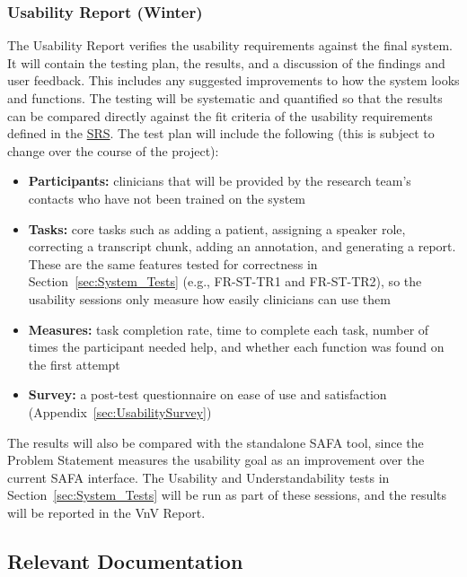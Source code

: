 \documentclass[12pt, titlepage]{article}
\newcommand{\SRSLink}{\href{https://github.com/Nour-Fawaz/MacaBoca/blob/main/pdfs/SRS/SRS.pdf}{SRS}}
\renewcommand{\_}{\oldunderscore\allowbreak}
\begin{document}
\subsubsection{Usability Report (Winter)}
The Usability Report verifies the usability requirements against the final system.
It will contain the testing plan, the results, and a discussion of the findings and user feedback. This includes any suggested improvements to how the system looks and functions.
The testing will be systematic and quantified so that the results can be compared directly against the fit criteria of the usability requirements defined in the \SRSLink{}.
The test plan will include the following (this is subject to change over the course of the project):
\begin{itemize}
  \item \textbf{Participants:} clinicians that will be provided by the research team's contacts who have not been trained on the system
  \item \textbf{Tasks:} core tasks such as adding a patient, assigning a speaker role, correcting a transcript chunk, adding an annotation, and generating a report. These are the same features tested for correctness in Section~\ref{sec:System_Tests} (e.g., FR-ST-TR1 and FR-ST-TR2), so the usability sessions only measure how easily clinicians can use them
  \item \textbf{Measures:} task completion rate, time to complete each task, number of times the participant needed help, and whether each function was found on the first attempt
  \item \textbf{Survey:} a post-test questionnaire on ease of use and satisfaction (Appendix~\ref{sec:UsabilitySurvey})
\end{itemize}
The results will also be compared with the standalone SAFA tool, since the Problem Statement measures the usability goal as an improvement over the current SAFA interface.
The Usability and Understandability tests in Section~\ref{sec:System_Tests} will be run as part of these sessions, and the results will be reported in the VnV Report.

\subsection{Relevant Documentation}
\end{document}
